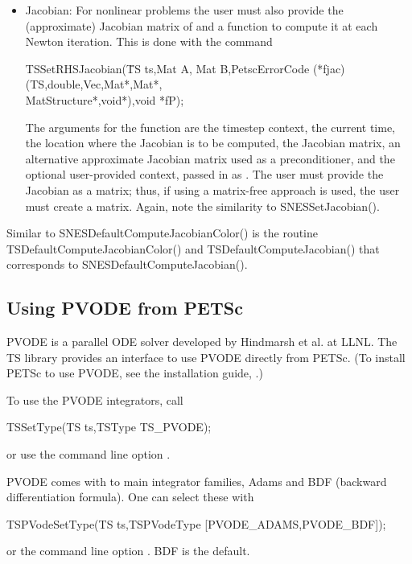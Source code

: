 \begin{itemize}
\item Jacobian: For nonlinear problems the user must also provide the 
(approximate) Jacobian matrix of  and a function to
compute it at each Newton iteration. This is done with the command
\begin{tabbing}
 TSSetRHSJacobian(\=TS ts,Mat A, Mat B,PetscErrorCode (*fjac)(TS,double,Vec,Mat*,Mat*,\\
                  \>        MatStructure*,void*),void *fP);
\end{tabbing}
The  arguments for the function  are
the timestep context, the current time, the location where the
Jacobian is to be computed, the Jacobian matrix, an alternative
approximate Jacobian matrix used as a preconditioner, and the optional
user-provided context, passed in as . The user must provide the 
Jacobian as a matrix; thus, if using a matrix-free approach is used, the
user must create a  matrix. Again, note the similarity
to SNESSetJacobian(). 
\end{itemize}

Similar to SNESDefaultComputeJacobianColor() is the
routine TSDefaultComputeJacobianColor() and TSDefaultComputeJacobian() that 
corresponds to SNESDefaultComputeJacobian(). 
 

\subsection{Using PVODE from PETSc}
\label{sec_pvode}

PVODE is a parallel ODE solver developed by Hindmarsh et al. at LLNL.
The TS library provides an interface to use PVODE directly from PETSc.
(To install PETSc to use PVODE, see the installation guide, .) 

To use the PVODE integrators, call 
\begin{tabbing}
 TSSetType(TS ts,TSType TS\_PVODE);
\end{tabbing}
or use the command line option  .  
  

PVODE comes with to main integrator families, Adams and BDF (backward 
differentiation formula). One can select these with 
\begin{tabbing}
 TSPVodeSetType(TS ts,TSPVodeType [PVODE\_ADAMS,PVODE\_BDF]);
\end{tabbing}
or the command line option . BDF is
the default.  
  

